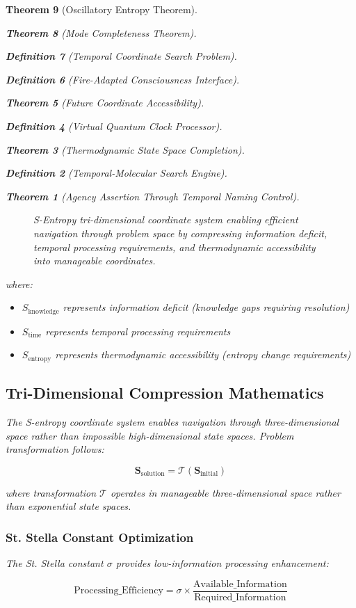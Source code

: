 \documentclass[12pt,a4paper]{article}
\newtheorem{theorem}{Theorem}[section]
\newtheorem{definition}[theorem]{Definition}
\begin{document}
\begin{theorem}[Oscillatory Entropy Theorem]
\begin{theorem}[Mode Completeness Theorem]
\begin{enumerate}
\begin{definition}[Temporal Coordinate Search Problem]
\begin{algorithm}
\begin{definition}[Fire-Adapted Consciousness Interface]
\begin{theorem}[Future Coordinate Accessibility]
\begin{definition}[Virtual Quantum Clock Processor]
\begin{itemize}
\begin{itemize}
\begin{theorem}[Thermodynamic State Space Completion]
\begin{definition}[Temporal-Molecular Search Engine]
\begin{theorem}[Agency Assertion Through Temporal Naming Control]
\begin{remark}
\begin{figure}[h]
\caption{S-Entropy tri-dimensional coordinate system enabling efficient navigation through problem space by compressing information deficit, temporal processing requirements, and thermodynamic accessibility into manageable coordinates.}
\label{fig:s_entropy_coordinates}
\end{figure}

where:
\begin{itemize}
\item $S_{\text{knowledge}}$ represents information deficit (knowledge gaps requiring resolution)
\item $S_{\text{time}}$ represents temporal processing requirements
\item $S_{\text{entropy}}$ represents thermodynamic accessibility (entropy change requirements)
\end{itemize}

\subsection{Tri-Dimensional Compression Mathematics}

The S-entropy coordinate system enables navigation through three-dimensional space rather than impossible high-dimensional state spaces. Problem transformation follows:

$$\mathbf{S}_{\text{solution}} = \mathcal{T}(\mathbf{S}_{\text{initial}})$$

where transformation $\mathcal{T}$ operates in manageable three-dimensional space rather than exponential state spaces.

\subsubsection{St. Stella Constant Optimization}

The St. Stella constant $\sigma$ provides low-information processing enhancement:

$$\text{Processing\_Efficiency} = \sigma \times \frac{\text{Available\_Information}}{\text{Required\_Information}}$$


\end{remark}
\end{theorem}
\end{definition}
\end{theorem}
\end{itemize}
\end{itemize}
\end{definition}
\end{theorem}
\end{definition}
\end{algorithm}
\end{definition}
\end{enumerate}
\end{theorem}
\end{theorem}
\end{document}
